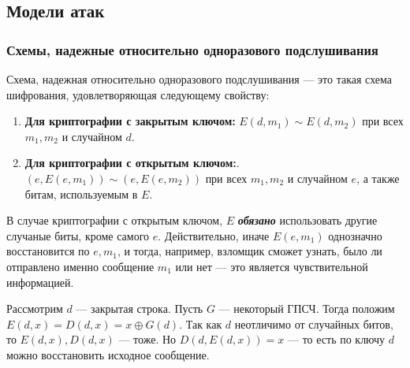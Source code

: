 \subsection{Модели атак}
\subsubsection{Схемы, надежные относительно одноразового подслушивания}

\begin{definition}
    Схема, надежная относительно одноразового подслушивания --- это такая схема шифрования, удовлетворяющая следующему свойству:
    \begin{enumerate}
        \item \textbf{Для криптографии с закрытым ключом:} \(E(d, m_1) \sim E(d, m_2)\) при всех \(m_1, m_2\) и случайном \(d\).
        \item \textbf{Для криптографии с открытым ключом:}. \((e, E(e, m_1)) \sim (e, E(e, m_2))\) при всех \(m_1, m_2\) и случайном \(e\), а также битам, используемым в \(E\).
    \end{enumerate}
\end{definition}

\begin{corollary}
    В случае криптографии с открытым ключом, \(E\) \textbf{\textit{обязано}} использовать другие случаные биты, кроме самого \(e\). Действительно, иначе \(E(e, m_1)\) однозначно восстановится по \(e, m_1\), и тогда, например, взломщик сможет узнать, было ли отправлено именно сообщение \(m_1\) или нет --- это является чувствительной информацией.
\end{corollary}

\begin{example}
    Рассмотрим \(d\) --- закрытая строка. Пусть \(G\) --- некоторый ГПСЧ. Тогда положим \(E(d, x) = D(d, x) = x \oplus G(d)\). Так как \(d\) неотличимо от случайных битов, то \(E(d, x), D(d, x)\) --- тоже. Но \(D(d, E(d, x)) = x\) --- то есть по ключу \(d\) можно восстановить исходное сообщение.
\end{example}

